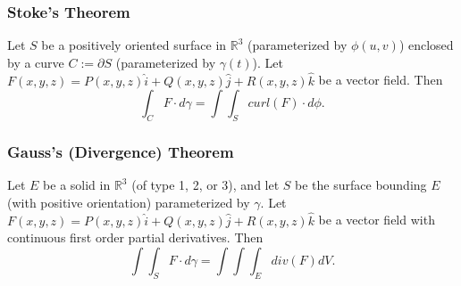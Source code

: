 \documentclass[12pt]{article}
\begin{document}
\subsubsection*{Stoke's Theorem}

Let $S$ be a positively oriented surface in $\mathbb{R}^3$ (parameterized by 
$\phi(u,v)$) enclosed by a curve $C := \partial S$ (parameterized by $\gamma(t)$).
Let $F(x,y,z) = P(x,y,z)\hat{i} + Q(x,y,z)\hat{j} + R(x,y,z)\hat{k}$ be a vector field.
Then
$$
\int_C F \cdot d\gamma = \int\int_S curl(F) \cdot d\phi.
$$

\subsubsection*{Gauss's (Divergence) Theorem}

Let $E$ be a solid in $\mathbb{R}^3$ (of type 1, 2, or 3), and let $S$ be the surface
bounding $E$ (with positive orientation) parameterized by $\gamma$.
Let $F(x,y,z) = P(x,y,z)\hat{i} + Q(x,y,z)\hat{j} + R(x,y,z)\hat{k}$ be a vector field
with continuous first order partial derivatives.
Then
$$
\int \int_S F\cdot d\gamma = \int\int\int_E div(F) dV.
$$
\end{document}
